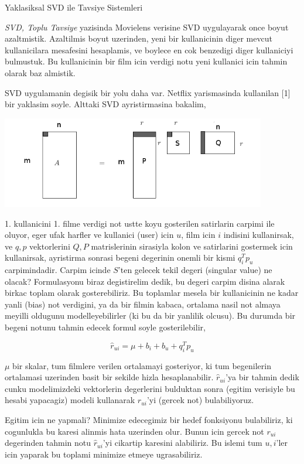 \documentclass[12pt,fleqn]{article}\usepackage{../common}
\begin{document}
Yaklasiksal SVD ile Tavsiye Sistemleri

{\em SVD, Toplu Tavsiye} yazisinda Movielens verisine SVD uygulayarak once
boyut azaltmistik. Azaltilmis boyut uzerinden, yeni bir kullanicinin diger
mevcut kullanicilara mesafesini hesaplamis, ve boylece en cok benzedigi
diger kullaniciyi bulmustuk. Bu kullanicinin bir film icin verdigi notu yeni
kullanici icin tahmin olarak baz almistik. 

SVD uygulamanin degisik bir yolu daha var. Netflix yarismasinda kullanilan
[1] bir yaklasim soyle. Alttaki SVD ayristirmasina bakalim, 

\includegraphics[height=4cm]{svdapprox_1.png}

1. kullanicini 1. filme verdigi not ustte koyu gosterilen satirlarin
carpimi ile oluyor, eger ufak harfler ve kullanici (user) icin $u$, film
icin $i$ indisini kullanirsak, ve $q,p$ vektorlerini $Q,P$ matrislerinin
sirasiyla kolon ve satirlarini gostermek icin kullanirsak, ayristirma
sonrasi begeni degerinin onemli bir kismi $q_i^Tp_u$ carpimindadir. Carpim
icinde $S$'ten gelecek tekil degeri (singular value) ne olacak?
Formulasyonu biraz degistirelim dedik, bu degeri carpim disina alarak
birkac toplam olarak gosterebiliriz. Bu toplamlar mesela bir kullanicinin
ne kadar yanli (bias) not verdigini, ya da bir filmin kabaca, ortalama
nasil not almaya meyilli oldugunu modelleyebilirler (ki bu da bir yanlilik
olcusu). Bu durumda bir begeni notunu tahmin edecek formul soyle
gosterilebilir,

$$
\hat{r}_{ui} = \mu + b_i + b_u + q_i^Tp_u
$$

$\mu$ bir skalar, tum filmlere verilen ortalamayi gosteriyor, ki tum
begenilerin ortalamasi uzerinden basit bir sekilde hizla
hesaplanabilir. $\hat{r}_{ui}$'ya bir tahmin dedik cunku modelimizdeki
vektorlerin degerlerini bulduktan sonra (egitim verisiyle bu hesabi
yapacagiz) modeli kullanarak $r_{ui}$'yi (gercek not) bulabiliyoruz. 

Egitim icin ne yapmali? Minimize edecegimiz bir hedef fonksiyonu
bulabiliriz, ki cogunlukla bu karesi alinmis hata uzerinden olur. Bunun
icin gercek not $r_{ui}$ degerinden tahmin notu $\hat{r}_{ui}$'yi cikartip
karesini alabiliriz. Bu islemi tum $u,i$'ler icin yaparak bu toplami
minimize etmeye ugrasabiliriz. 
\end{document}
